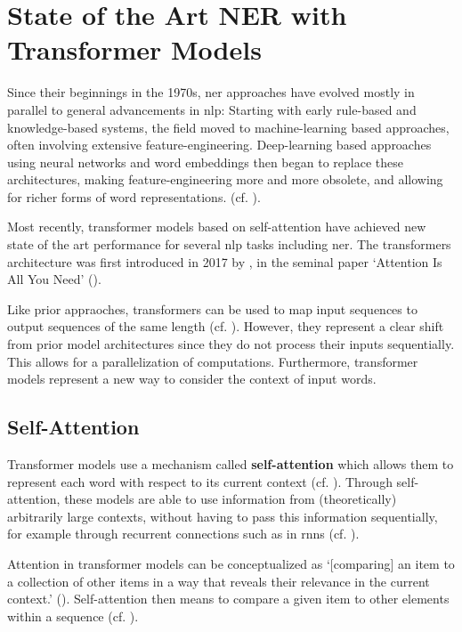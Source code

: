 \chapter{State of the Art NER with Transformer Models}
\label{cha:ner_approaches}

Since their beginnings in the 1970s, \gls{ner} approaches have evolved mostly in parallel to general advancements in \gls{nlp}: Starting with early rule-based and knowledge-based systems, the field moved to machine-learning based approaches, often involving extensive feature-engineering. Deep-learning based approaches using neural networks and word embeddings then began to replace these architectures, making feature-engineering more and more obsolete, and allowing for richer forms of word representations. (cf. \cite{yadav_survey_2019}). 

Most recently, transformer models based on self-attention have achieved new state of the art performance for several \gls{nlp} tasks including \gls{ner}. The transformers architecture was first introduced in 2017 by \citeauthor{vaswani_2017}, in the seminal paper `Attention Is All You Need' (\cite{vaswani_2017}).

Like prior appraoches, transformers can be used to map input sequences to output sequences of the same length (cf. \cite[3]{tunstall_natural_2022}). However, they represent a clear shift from prior model architectures since they do not process their inputs sequentially. This allows for a parallelization of computations. Furthermore, transformer models represent a new way to consider the context of input words. 

\section{Self-Attention}
Transformer models use a mechanism called \textbf{self-attention} which allows them to represent each word with respect to its current context (cf. \cite[25-26]{vajjala_practical_2020}). Through self-attention, these models are able to use information from (theoretically) arbitrarily large contexts, without having to pass this information sequentially, for example through recurrent connections such as in \glspl{rnn} (cf. \cite[191]{jurafsky_2021}). 

Attention in transformer models can be conceptualized as `[comparing] an item to a collection of other items in a way that reveals their relevance in the current context.' (\cite[192]{jurafsky_2021}). Self-attention then means to compare a given item to other elements within a sequence (cf. \cite[192]{jurafsky_2021}).

